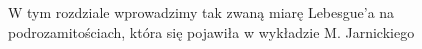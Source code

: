 W tym rozdziale wprowadzimy tak zwaną miarę Lebesgue'a na podrozamitościach, która się pojawiła w wykładzie M. Jarnickiego \citep{Jarnicki}